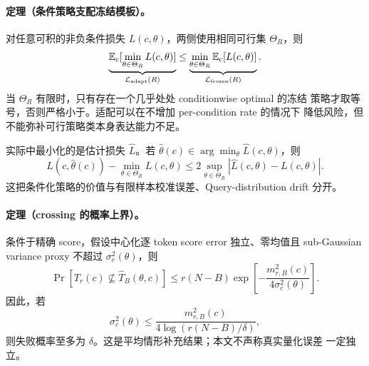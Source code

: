 \paragraph{定理（条件策略支配冻结模板）。}
对任意可积的非负条件损失 $L(c,\theta)$，两侧使用相同可行集
$\Theta_R$，则
\begin{equation}
 \underbrace{\mathbb E_c[
  \min_{\theta\in\Theta_R}L(c,\theta)]}_{\mathcal L_{\rm adapt}(R)}
 \le
 \underbrace{\min_{\theta\in\Theta_R}
  \mathbb E_c[L(c,\theta)]}_{\mathcal L_{\rm frozen}(R)} .
 \label{eq:conditional-policy-dominance}
\end{equation}
当 $\Theta_R$ 有限时，只有存在一个几乎处处 conditionwise optimal 的冻结
策略才取等号，否则严格小于。适配可以在不增加 per-condition rate 的情况下
降低风险，但不能弥补可行策略类本身表达能力不足。

实际中最小化的是估计损失 $\widehat L$。若
$\widehat\theta(c)\in\arg\min_\theta\widehat L(c,\theta)$，则
\begin{equation}
 L(c,\widehat\theta(c))-\min_{\theta\in\Theta_R}L(c,\theta)
 \le2\sup_{\theta\in\Theta_R}
 |\widehat L(c,\theta)-L(c,\theta)|.
 \label{eq:conditional-selection-regret}
\end{equation}
这把条件化策略的价值与有限样本校准误差、Query-distribution drift 分开。

\paragraph{定理（crossing 的概率上界）。}
条件于精确 score，假设中心化逐 token score error 独立、零均值且
sub-Gaussian variance proxy 不超过 $\sigma_c^2(\theta)$，则
\begin{equation}
 \Pr[T_r(c)\not\subseteq\widehat T_B(\theta,c)]
 \le r(N-B)
 \exp\!\left[-\frac{m_{r,B}^2(c)}
 {4\sigma_c^2(\theta)}\right].
 \label{eq:crossing-probability}
\end{equation}
因此，若
\begin{equation}
 \sigma_c^2(\theta)
 \le\frac{m_{r,B}^2(c)}
 {4\log(r(N-B)/\delta)},
 \label{eq:crossing-subgaussian-condition}
\end{equation}
则失败概率至多为 $\delta$。这是平均情形补充结果；本文不声称真实量化误差
一定独立。

